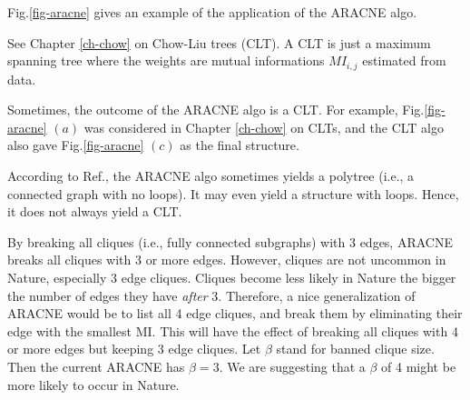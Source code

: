 Fig.\ref{fig-aracne}
gives an example 
of the application
of the ARACNE algo.

See Chapter \ref{ch-chow} on 
Chow-Liu trees (CLT).
A CLT is just
a  maximum spanning tree
where the weights are 
mutual informations 
 $MI_{i,j}$
estimated from data.

Sometimes, the outcome
of the ARACNE algo is a CLT.
For example,
Fig.\ref{fig-aracne}
$(a)$
was considered
in Chapter \ref{ch-chow}
on CLTs, and
the CLT algo
also
gave 
Fig.\ref{fig-aracne}
$(c)$ as the final structure.

According to Ref.\cite{aracne}, the 
 ARACNE algo sometimes 
yields  a polytree (i.e., 
a connected graph with no loops).
It may even  
yield a structure with loops.
Hence, it does not always yield a CLT.

By breaking all cliques (i.e., fully
connected subgraphs)
with 3 edges, ARACNE 
breaks all cliques with  
3 or more edges. 
However, cliques are 
not uncommon in Nature,
especially 3 edge cliques. 
Cliques become less likely in Nature 
the bigger the number of edges they have
{\it after} 3.
Therefore, a nice  
generalization of ARACNE
would be to list all 
4 edge cliques,
and break 
them by eliminating their edge
with the smallest MI.
This will
have the effect of breaking
all cliques with 
4 or more edges
but keeping 3 edge cliques.
Let $\beta$ stand for banned clique
size.  Then
the current ARACNE has 
$\beta=3$.
We are suggesting that a $\beta$ of
4 might be more likely
to occur in Nature.

